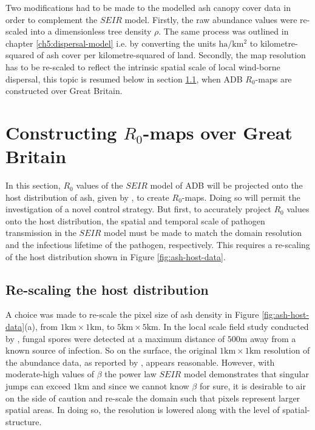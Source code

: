 Two modifications had to be made to the modelled ash canopy cover data in order to complement the $SEIR$ model. Firstly, the raw abundance values were re-scaled into a dimensionless tree density $\rho$. The same process was outlined in chapter \ref{ch5:dispersal-model} i.e. by converting the units $\mathrm{ha/km^2}$ to kilometre-squared of ash cover per kilometre-squared of land. Secondly, the map resolution has to be re-scaled to reflect the intrinsic spatial scale of local wind-borne dispersal, this topic is resumed below in section \ref{ch6:re-scaling-host-data}, when ADB $R_0$-maps are constructed over Great Britain.

\section{Constructing $R_0$-maps over Great Britain}
\label{sec:r0-map-construct}
In this section, $R_0$ values of the $SEIR$ model of ADB will be projected onto the host distribution of ash, given by \cite{hill.data}, to create $R_0$-maps. Doing so will permit the investigation of a novel control strategy. But first, to accurately project $R_0$ values onto the host distribution, the spatial and temporal scale of pathogen transmission in the $SEIR$ model must be made to match the domain resolution and the infectious lifetime of the pathogen, respectively. This requires a re-scaling of the host distribution shown in Figure \ref{fig:ash-host-data}.

\subsection{Re-scaling the host distribution}
\label{ch6:re-scaling-host-data}
A choice was made to re-scale the pixel size of ash density in Figure \ref{fig:ash-host-data}(a), from $1\mathrm{km} \times 1 \mathrm{km}$, to $5\mathrm{km} \times 5 \mathrm{km}$. In the local scale field study conducted by \cite{grosdidier2018tracking}, fungal spores were detected at a maximum distance of $500\mathrm{m}$ away from a known source of infection. So on the surface, the original $1\mathrm{km} \times 1 \mathrm{km}$ resolution of the abundance data, as reported by \cite{hill.data}, appears reasonable. However, with moderate-high values of $\beta$ the power law $SEIR$ model demonstrates that singular jumps can exceed $1\mathrm{km}$ and since we cannot know $\beta$ for sure, it is desirable to air on the side of caution and re-scale the domain such that pixels represent larger spatial areas. In doing so, the resolution is lowered along with the level of spatial-structure. 

